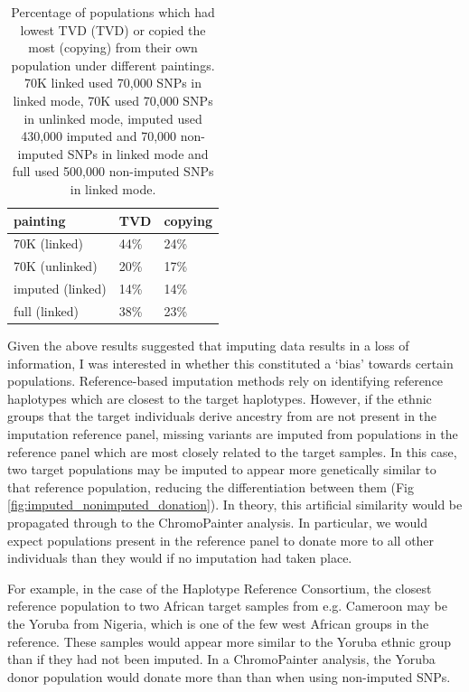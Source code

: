 \begin{table}
\centering
\small
\begin{tabular}{l|l|l}
\toprule
painting & TVD & copying\\
\midrule
70K (linked) & 44\% & 24\%\\
70K (unlinked) & 20\% & 17\%\\
imputed (linked) & 14\% & 14\%\\
full (linked) & 38\% & 23\%\\
\bottomrule
\end{tabular}
\caption{Percentage of populations which had lowest TVD (TVD) or copied the most (copying) from their own population under different paintings. 70K linked used 70,000 SNPs in linked mode, 70K used 70,000 SNPs in unlinked mode, imputed used 430,000 imputed and 70,000 non-imputed SNPs in linked mode and full used 500,000 non-imputed SNPs in linked mode.}
\label{table:TVD_copying}
\end{table}

Given the above results suggested that imputing data results in a loss of information, I was interested in whether this constituted a `bias' towards certain populations. Reference-based imputation methods rely on identifying reference haplotypes which are closest to the target haplotypes. However, if the ethnic groups that the target individuals derive ancestry from are not present in the imputation reference panel, missing variants are imputed from populations in the reference panel which are most closely related to the target samples. In this case, two target populations may be imputed to appear more genetically similar to that reference population, reducing the differentiation between them (Fig \ref{fig:imputed_nonimputed_donation}). In theory, this artificial similarity would be propagated through to the ChromoPainter analysis. In particular, we would expect populations present in the reference panel to donate more to all other individuals than they would if no imputation had taken place.  

For example, in the case of the Haplotype Reference Consortium, the closest reference population to two African target samples from e.g. Cameroon may be the Yoruba from Nigeria, which is one of the few west African groups in the reference. These samples would appear more similar to the Yoruba ethnic group than if they had not been imputed. In a ChromoPainter analysis, the Yoruba donor population would donate more than than when using non-imputed SNPs.    

